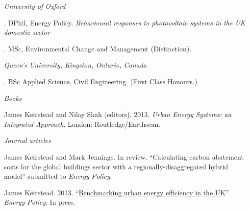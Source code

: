 \documentclass[11pt,a4paper]{article}
\begin{document}
\noindent{}%
%
\emph{University of Oxford \vspace{0.01in}}

.  DPhil, Energy Policy. \emph{Behavioural responses to photovoltaic systems in the UK domestic sector}

.  MSc, Environmental Change and Management (Distinction).

\medskip

\noindent\emph{Queen's University, Kingston, Ontario, Canada\vspace{0.02in}}

. BSc Applied Science, Civil Engineering. (First Class Honours.) 

\bigskip
 
\noindent{}%
%
\noindent\emph{Books \vspace{0.01in}}

\ind James Keirstead and Nilay Shah (editors).  2013. \emph{Urban Energy Systems: an Integrated Approach}. London: Routledge/Earthscan.

\bigskip

\emph{Journal articles \vspace{0.01in}} %
 
%

\ind James Keirstead and Mark Jennings. In review. ``Calculating carbon abatement costs for the global buildings sector with a regionally-disaggregated hybrid model'' submitted to \emph{Energy Policy}.

\ind James Keirstead. 2013. ``\href{http://dx.doi.org/10.1016/j.enpol.2013.08.063}{Benchmarking urban energy efficiency in the UK}'' \emph{Energy Policy}.  In press.
\end{document}
